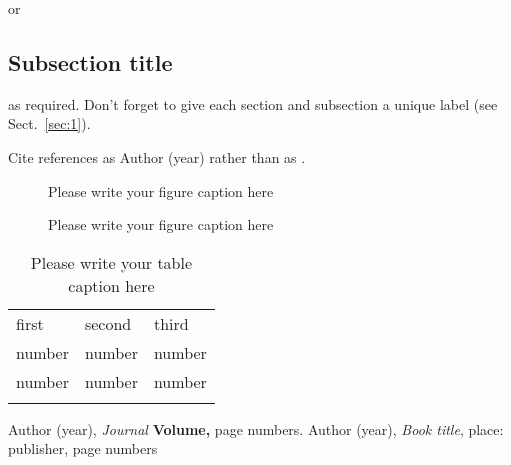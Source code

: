 or

\subsection{Subsection title}\label{sec:2}

as required. Don't forget to give each section and subsection a
unique label (see Sect.~\ref{sec:1}).

Cite references as Author (year) rather than as \cite{RefJ}.

\begin{figure}
\vspace{5cm}       %
\caption{Please write your figure caption here}
\label{fig:1}       %
\end{figure}
%
\begin{figure*}
\vspace*{5cm}       %
\caption{Please write your figure caption here}
\label{fig:2}       %
\end{figure*}
%
\begin{table}
\caption{Please write your table caption here}
\label{tab:1}       %
\begin{tabular}{lll}
\hline\noalign{\smallskip}
first & second & third  \\
\noalign{\smallskip}\hline\noalign{\smallskip}
number & number & number \\
number & number & number \\
\noalign{\smallskip}\hline
\end{tabular}
\vspace*{5cm}  %
\end{table}
%
% 
% 
%
\begin{thebibliography}{}
%
%
Author (year), \textit{Journal} \textbf{Volume,} page numbers.
Author (year), \textit{Book title}, place: publisher, page numbers
\end{thebibliography}



